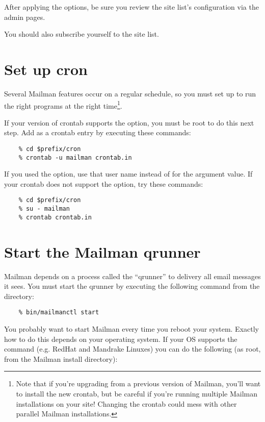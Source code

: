 \documentclass{howto}
\begin{document}
After applying the  options, be sure you review the
site list's configuration via the admin pages.

You should also subscribe yourself to the site list.

\section{Set up cron}

Several Mailman features occur on a regular schedule, so you must set up
 to run the right programs at the right time\footnote{Note that
if you're upgrading from a previous version of Mailman, you'll want to install
the new crontab, but be careful if you're running multiple Mailman
installations on your site!  Changing the crontab could mess with other
parallel Mailman installations.}.

If your version of crontab supports the  option, you must be
root to do this next step.  Add  as a
crontab entry by executing these commands:

\begin{verbatim}
    % cd $prefix/cron
    % crontab -u mailman crontab.in
\end{verbatim}

If you used the  option, use that user name
instead of  for the  argument value.  If your
crontab does not support the  option, try these commands:

\begin{verbatim}
    % cd $prefix/cron
    % su - mailman
    % crontab crontab.in
\end{verbatim}

\section{Start the Mailman qrunner}

Mailman depends on a process called the ``qrunner'' to delivery all
email messages it sees.  You must start the qrunner by executing the following
command from the  directory:

\begin{verbatim}
    % bin/mailmanctl start
\end{verbatim}

You probably want to start Mailman every time you reboot your system.  Exactly
how to do this depends on your operating system.  If your OS supports the
 command (e.g. RedHat and Mandrake Linuxes) you can
do the following (as root, from the Mailman install directory):
\end{document}
